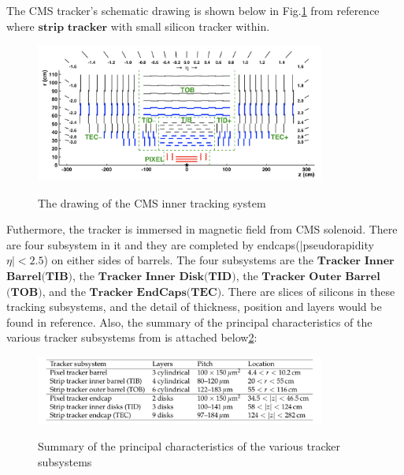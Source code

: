 			The CMS tracker's schematic drawing is shown below in Fig.\ref{ExpApp:fig:tracker} from reference\cite{Chatrchyan:2014fea} where $\textbf{strip tracker}$ with small silicon tracker within. 

			\begin{figure}[H]
			\centering{}
		    	\includegraphics[width=0.85\textwidth]{Figures/ExpApparatus/tracker.png}\\
			\caption{The drawing of the CMS inner tracking system\cite{Chatrchyan:2014fea}}
			\label{ExpApp:fig:tracker}
			\end{figure}
			\FloatBarrier

			Futhermore, the tracker is immersed in magnetic field from CMS solenoid. There are four subsystem in it and they are completed by endcaps(|pseudorapidity $\eta | < 2.5$) on either sides of barrels. The four subsystems are the $\textbf{Tracker}$ $\textbf{Inner}$ $\textbf{Barrel}$$\textbf{(TIB)}$, the $\textbf{Tracker}$ $\textbf{Inner}$ $\textbf{Disk}$$\textbf{(TID)}$, the $\textbf{Tracker}$ $\textbf{Outer}$ $\textbf{Barrel}$$\textbf{(TOB)}$, and the $\textbf{Tracker}$ $\textbf{EndCaps}$$\textbf{(TEC)}$. There are slices of silicons in these tracking subsystems, and the detail of thickness, position and layers would be found in reference\cite{Chatrchyan:2014fea}. Also, the summary of the principal characteristics of the various tracker subsystems from \cite{Chatrchyan:2014fea} is attached below\ref{ExpApp:fig:tracker_sum}:
			
			\begin{figure}[H]
			\centering{}
		    	\includegraphics[width=0.85\textwidth]{Figures/ExpApparatus/summary_subtracker.png}\\
			\caption{Summary of the principal characteristics of the various tracker subsystems\cite{Chatrchyan:2014fea}}
			\label{ExpApp:fig:tracker_sum}
			\end{figure}
			\FloatBarrier

